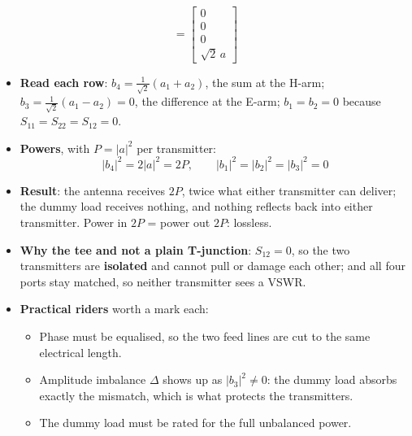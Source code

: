 {\begin{itemize}
\[       = \begin{bmatrix} 0\\ 0\\ 0\\ \sqrt{2}\,a \end{bmatrix} \]
\end{itemize}}{%
\begin{itemize}
  \item \textbf{Read each row}: $b_4 = \tfrac{1}{\sqrt{2}}(a_1 + a_2)$, the sum at the
    H-arm; $b_3 = \tfrac{1}{\sqrt{2}}(a_1 - a_2) = 0$, the difference at the E-arm;
    $b_1 = b_2 = 0$ because $S_{11} = S_{22} = S_{12} = 0$.
  \item \textbf{Powers}, with $P = |a|^2$ per transmitter:
    \[ |b_4|^2 = 2|a|^2 = 2P, \qquad |b_1|^2 = |b_2|^2 = |b_3|^2 = 0 \]
  \item \textbf{Result}: the antenna receives $2P$, twice what either transmitter can
    deliver; the dummy load receives nothing, and nothing reflects back into either
    transmitter. Power in $2P$ = power out $2P$: lossless.
  \item \textbf{Why the tee and not a plain T-junction}: $S_{12} = 0$, so the two
    transmitters are \textbf{isolated} and cannot pull or damage each other; and all four
    ports stay matched, so neither transmitter sees a VSWR.
  \item \textbf{Practical riders} worth a mark each:
  \begin{itemize}
    \item Phase must be equalised, so the two feed lines are cut to the same electrical
      length.
    \item Amplitude imbalance $\Delta$ shows up as $|b_3|^2 \neq 0$: the dummy load
      absorbs exactly the mismatch, which is what protects the transmitters.
    \item The dummy load must be rated for the full unbalanced power.
  \end{itemize}
\end{itemize}}


